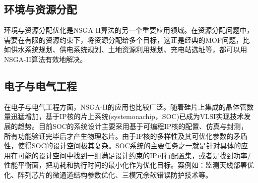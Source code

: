 \documentclass[lang=cn,a4paper,citestyle=gb7714-2015, bibstyle=gb7714-2015]{elegantpaper}
\newcommand{\mycite}[1]{\textsuperscript{\parencite{#1}}}
\begin{document}
    \subsection{环境与资源分配}

    环境与资源分配优化是NSGA-II算法的另一个重要应用领域。在资源分配问题中，需要在有限的资源约束下，将资源分配给多个目标，这正是经典的MOP问题，比如供水系统规划\mycite{SDNY202307032}\mycite{SDNY202212043}、供电系统规划\mycite{KXJS202214018}\mycite{JZDF202301007}、土地资源利用规划\mycite{STBC202402007}\mycite{CHKD202208018}、充电站选址\mycite{ZZDZ20241024001}等，都可以用NSGA-II算法有效地解决。


    \subsection{电子与电气工程}
    在电子与电气工程方面，NSGA-II的应用也比较广泛。随着硅片上集成的晶体管数量迅猛增加，基于IP核的片上系统(systemonachip，SOC)已成为VLSI实现技术发展的趋势。目前SOC的系统设计主要采用基于可编程IP核的配置、仿真与封测，所有功能验证完毕后才产生物理芯片。由于IP核的多样性及其可优化参数的矛盾性，使得SOC的设计空间极其复杂。SOC系统的主要任务之一就是针对具体的应用在可能的设计空间中找到一组满足设计约束的IP可行配置集，或者是找到功率/性能平衡面，把功耗和执行时间的最小化作为优化目标。案例如：监测天线部署优化\mycite{XDKD202105027}、阵列芯片的微通道结构参数优化\mycite{HXDY202404012}、三模冗余软错误防护技术\mycite{DZYX202405006}等。


    \nocite{*}
    \printbibliography[heading=bibintoc, title=\ebibname]
\end{document}
